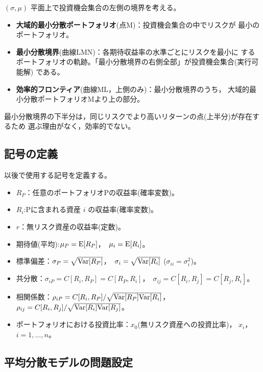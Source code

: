 $(\sigma,\mu)$ 平面上で投資機会集合の左側の境界を考える。

\begin{definition}
\begin{itemize}
\item \textbf{大域的最小分散ポートフォリオ}(点M)：投資機会集合の中でリスクが
最小のポートフォリオ。
\item \textbf{最小分散境界}(曲線LMN)：各期待収益率の水準ごとにリスクを最小に
するポートフォリオの軌跡。「最小分散境界の右側全部」が投資機会集合(実行可能解)
である。
\item \textbf{効率的フロンティア}(曲線ML，上側のみ)：最小分散境界のうち，
大域的最小分散ポートフォリオMより上の部分。
\end{itemize}
\end{definition}

最小分散境界の下半分は，同じリスクでより高いリターンの点(上半分)が存在するため
選ぶ理由がなく，効率的でない。

\subsection{記号の定義}

以後で使用する記号を定義する。
\begin{itemize}
\item $R_P$：任意のポートフォリオPの収益率(確率変数)。
\item $R_i$:Pに含まれる資産 $i$ の収益率(確率変数)。
\item $r$：無リスク資産の収益率(定数)。
\item 期待値(平均):$\mu_P = \mathrm{E}[R_P]$，\ $\mu_i = \mathrm{E}[R_i]$。
\item 標準偏差：$\sigma_P = \sqrt{\mathrm{Var}[R_P]}$，\ $\sigma_i = \sqrt{\mathrm{Var}[R_i]}$
($\sigma_{ii} = \sigma_i^2$)。
\item 共分散：$\sigma_{iP} = C[R_i, R_P] = C[R_P, R_i]$，\
$\sigma_{ij} = C[R_i,R_j] = C[R_j,R_i]$。
\item 相関係数：$\rho_{iP} = C[R_i,R_P]/\sqrt{\mathrm{Var}[R_P]\mathrm{Var}[R_i]}$，\
$\rho_{ij} = C[R_i,R_j]/\sqrt{\mathrm{Var}[R_i]\mathrm{Var}[R_j]}$。
\item ポートフォリオにおける投資比率：$x_0$(無リスク資産への投資比率)，
$x_i$， $i=1,\dots,n$。
\end{itemize}

\subsection{平均分散モデルの問題設定}

